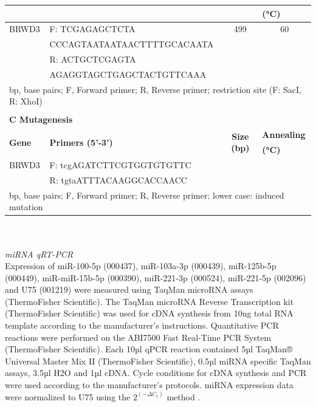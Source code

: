 \begin{table}[htbp]
\begin{tabular}{p{4.665em}lll}
    \multicolumn{1}{r}{} &       &       & \multicolumn{1}{p{4.61em}}{\textbf{(°C)}} \\
    \hline
    BRWD3 & \multicolumn{1}{p{20.72em}}{F: TCGAGAGCTCTA} & \multicolumn{1}{c}{499} & \multicolumn{1}{c}{60} \\
    \multicolumn{1}{r}{} & \multicolumn{1}{p{20.72em}}{    CCCAGTAATAATAACTTTTGCACAATA} &       &  \\
    \multicolumn{1}{r}{} & \multicolumn{1}{p{20.72em}}{R: ACTGCTCGAGTA } &       &  \\
    \multicolumn{1}{r}{} & \multicolumn{1}{p{20.72em}}{AGAGGTAGCTGAGCTACTGTTCAAA} &       &  \\
    \hline\hline
    \multicolumn{4}{p{32.16em}}{bp, base pairs; F, Forward primer; R, Reverse primer; restriction site (F: SacI, R: XhoI)} \\
    \multicolumn{4}{c}{} \\
    \multicolumn{4}{p{32.16em}}{\textbf{C Mutagenesis}} \\
    \hline\hline
    \multirow{2}[2]{*}{\textbf{Gene}} & \multicolumn{1}{l}{\multirow{2}[2]{*}{\textbf{Primers (5’-3’)}}} & \multicolumn{1}{c}{\multirow{2}[2]{*}{\textbf{Size (bp)}}} & \multicolumn{1}{p{4.61em}}{\textbf{Annealing}} \\
    \multicolumn{1}{r}{} &       &       & \multicolumn{1}{p{4.61em}}{\textbf{(°C)}} \\
    \hline
    BRWD3 & \multicolumn{1}{p{20.72em}}{F: tcgAGATCTTCGTGGTGTGTTC } &       &  \\
    \multicolumn{1}{r}{} & \multicolumn{1}{p{20.72em}}{R: tgtaATTTACAAGGCACCAACC } &       &  \\
    \hline\hline
    \multicolumn{4}{p{32.16em}}{bp, base pairs; F, Forward primer; R, Reverse primer; lower case: induced mutation} \\
    \end{tabular}%
  \label{table:table2}%
\end{table}%
\\
\\
\textit{miRNA qRT-PCR}
\\
Expression of miR-100-5p (000437), miR-103a-3p (000439), miR-125b-5p\\(000449), miR-miR-15b-5p (000390), miR-221-3p (000524), miR-221-5p (002096) and U75 (001219) were measured using TaqMan microRNA assays (ThermoFisher Scientific). The TaqMan microRNA Reverse Transcription kit (ThermoFisher Scientific) was used for cDNA synthesis from 10ng total RNA template according to the manufacturer’s instructions. Quantitative PCR reactions were performed on the ABI7500 Fast Real-Time PCR System (ThermoFisher Scientific). Each 10µl qPCR reaction contained 5µl TaqMan® Universal Master Mix II (ThermoFisher Scientific), 0.5µl miRNA specific TaqMan assays, 3.5µl H2O and 1µl cDNA. Cycle conditions for cDNA synthesis and PCR were used according to the manufacturer’s protocols. miRNA expression data were normalized to U75 using the $2^{(- \Delta C_t )}$ method \cite{Livak2001}.
